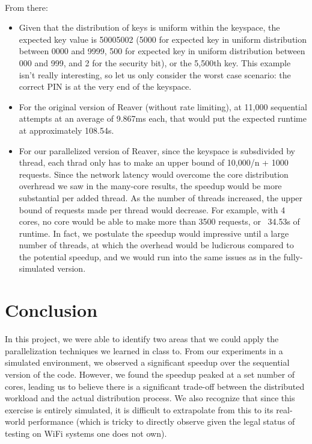 \documentclass[a4paper]{article}
\begin{document}
\\
From there: 
\begin{itemize}
    \item Given that the distribution of keys is uniform within the keyspace, 
          the expected key value is 50005002 (5000 for expected key in uniform distribution between 0000 and 9999, 500 for expected key in uniform distribution between 000 and 999, and 2 for the security bit), or the 5,500th key. This example isn't really interesting, so let us only consider the worst case scenario: the 
          correct PIN is at the very end of the keyspace.
    \item For the original version of Reaver (without rate limiting), at 11,000 sequential attempts at an average of 9.867ms each, that would put the expected runtime at approximately 108.54s. 
    \item For our parallelized version of Reaver, since the keyspace is subsdivided 
    by thread, each thrad only has to make an upper bound of 10,000/n + 1000 requests.
    Since the network latency would overcome the core distribution overhread we saw in the many-core results, the speedup would be more substantial per added thread.  As the number of threads increased, the upper bound of requests made per thread would decrease. For example, with 4 cores, no core
    would be able to make more than 3500 requests, or ~34.53s of runtime. In fact, we postulate the speedup would impressive until a large number of threads, at which the overhead would be ludicrous compared to the potential speedup, and we would run into the same issues as in the fully-simulated version.
    
\end{itemize}

\section{Conclusion}
In this project, we were able to identify two areas that we could apply the parallelization techniques
we learned in class to. From our experiments in a simulated environment, we observed a significant 
speedup over the sequential version of the code. However, we found the speedup peaked at a set
number of cores, leading us to believe there is a significant trade-off between the distributed 
workload and the actual distribution process. We also recognize that since this exercise is entirely
simulated, it is difficult to extrapolate from this to its real-world performance (which is tricky to  
directly observe given the legal status of testing on WiFi systems one does not own). 



\cite{vanhoef}
\cite{mustafa}
\cite{viehbock}
\cite{aircrack}
\end{document}
